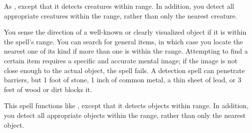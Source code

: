 \begin{spellheader}
\end{spellheader}
\begin{spelleffects}
    \spellrng{\rngext}
    \spelldur{\durmed \dismissable}
    \spelleffect As , except that it detects creatures within \rngext range. In addition, you detect all appropriate creatures within the range, rather than only the nearest creature.
\end{spelleffects}
\begin{spellfooter}
    
\end{spellfooter}

\begin{spellheader}
    \spellrng{\rnglong}
    \spelldur{\durmed \dismissable}
\end{spellheader}
\begin{spelleffects}
    \spelleffect You sense the direction of a well-known or clearly visualized object if it is within the spell's range. You can search for general items, in which case you locate the nearest one of its kind if more than one is within the range. Attempting to find a certain item requires a specific and accurate mental image; if the image is not close enough to the actual object, the spell fails.
    \spellnotes A detection spell can penetrate barriers, but 1 foot of stone, 1 inch of common metal, a thin sheet of lead, or 3 feet of wood or dirt blocks it.
\end{spelleffects}
\begin{spellfooter}
    
\end{spellfooter}

\begin{spellheader}
    \spellrng{\rngext}
\end{spellheader}
\begin{spelleffects}
    \spelldur{\durmed \dismissable}
    \spelleffect This spell functions like , except that it detects objects within \rngext range. In addition, you detect all appropriate objects within the range, rather than only the nearest object. 
\end{spelleffects}
\begin{spellfooter}
    
\end{spellfooter}

